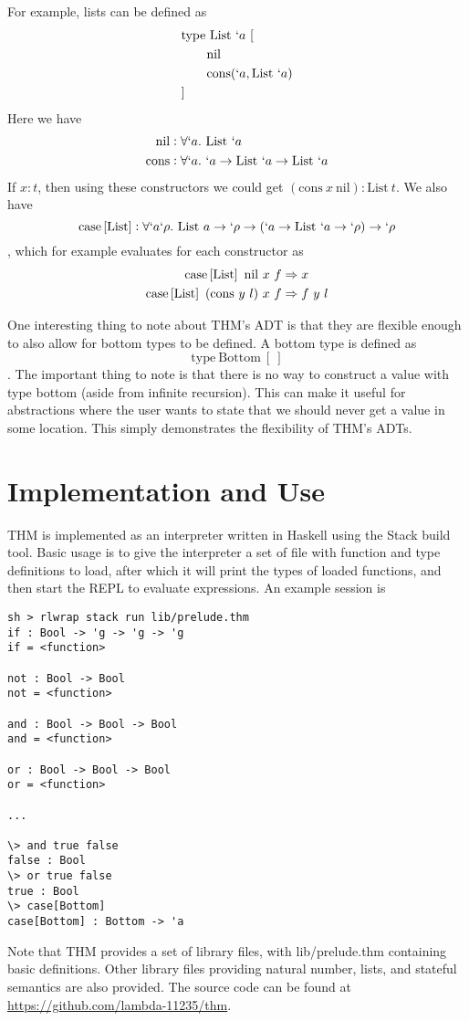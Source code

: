\documentclass[12pt]{article}
\newcommand{\thmcase}[1]{\mathrm{case}\sbr{#1}}
\begin{document}
For example, lists can be defined as
\begin{align*}
  &\mathrm{type}~\mathrm{List}~`a~[\\
  &\qquad \mathrm{nil}\\
  &\qquad \mathrm{cons}(`a, \mathrm{List}~`a)\\
  &]
\end{align*}
Here we have
\begin{align*}
  \mathrm{nil} &: \forall `a.~\mathrm{List}~`a\\
  \mathrm{cons} &: \forall `a.~`a \to \mathrm{List}~`a \to \mathrm{List}~`a
\end{align*}
If $x : t$, then using these constructors we could get
$(\mathrm{cons}~x~\mathrm{nil}) : \mathrm{List}~t$.
We also have
$$\thmcase{\mathrm{List}} : \forall `a `\rho.~
\mathrm{List}~a \to `\rho \to (`a \to \mathrm{List}~`a \to `\rho) \to `\rho$$,
which for example evaluates for each constructor as
\begin{align*}
  \thmcase{\mathrm{List}}~\mathrm{nil}~x~f &\Rightarrow x\\
  \thmcase{\mathrm{List}}~(\mathrm{cons}~y~l)~x~f &\Rightarrow f~y~l
\end{align*}

One interesting thing to note about THM's ADT is that they are
flexible enough to also allow for bottom types to be defined.
A bottom type is defined as
$$\mathrm{type}~\mathrm{Bottom}~[~]$$.
The important thing to note is that there is no way to construct a
value with type bottom (aside from infinite recursion).
This can make it useful for abstractions where the user wants to state
that we should never get a value in some location.
This simply demonstrates the flexibility of THM's ADTs.


\section{Implementation and Use}

THM is implemented as an interpreter written in Haskell using the
Stack build tool\cite{stack}.
Basic usage is to give the interpreter a set of file with function and
type definitions to load, after which it will print the types of
loaded functions, and then start the REPL to evaluate expressions.
An example session is
\begin{verbatim}
sh > rlwrap stack run lib/prelude.thm
if : Bool -> 'g -> 'g -> 'g
if = <function>

not : Bool -> Bool
not = <function>

and : Bool -> Bool -> Bool
and = <function>

or : Bool -> Bool -> Bool
or = <function>

...

\> and true false
false : Bool
\> or true false
true : Bool
\> case[Bottom]
case[Bottom] : Bottom -> 'a
\end{verbatim}
Note that THM provides a set of library files, with lib/prelude.thm
containing basic definitions.
Other library files providing natural number, lists, and stateful
semantics are also provided.
The source code can be found at
\url{https://github.com/lambda-11235/thm}.
\end{document}
